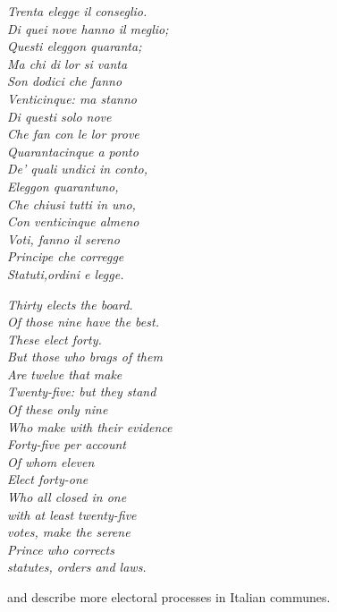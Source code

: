 \noindent
\begin{minipage}[t]{.45\textwidth}
	\centering
\textit{	Trenta elegge il conseglio. \\ 
	Di quei nove hanno il meglio; \\
	Questi eleggon quaranta; \\
	Ma chi di lor si vanta \\
	Son dodici che fanno \\
	Venticinque: ma stanno \\
	Di questi solo nove \\
	Che fan con le lor prove \\
	Quarantacinque a ponto \\
	De’ quali undici in conto, \\
	Eleggon quarantuno, \\
	Che chiusi tutti in uno, \\
	Con venticinque almeno \\
	Voti, fanno il sereno \\
	Principe che corregge \\
	Statuti,ordini e legge.}
\end{minipage}%
\begin{minipage}[t]{.45\textwidth}
	\centering
\textit{Thirty elects the board. \\ 
	Of those nine have the best. \\
	These elect forty.\\
	But those who brags of them \\
	Are twelve that make \\
	Twenty-five: but they stand \\
	Of these only nine \\
	Who make with their evidence \\
	Forty-five per account \\
	Of whom eleven \\
	Elect forty-one \\
	Who all closed in one \\
	with at least twenty-five \\
	votes, make the serene \\
	Prince who corrects \\
	statutes, orders and laws. \\}
\end{minipage}

\citet{Wolfson1899} and \citet{Keller2014} describe more electoral processes in Italian communes. 

